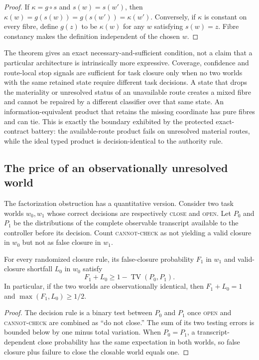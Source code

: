 \begin{proof}
If $\kappa=g\circ s$ and $s(w)=s(w')$, then
$\kappa(w)=g(s(w))=g(s(w'))=\kappa(w')$.  Conversely, if $\kappa$ is constant
on every fibre, define $g(z)$ to be $\kappa(w)$ for any $w$ satisfying
$s(w)=z$.  Fibre constancy makes the definition independent of the chosen
$w$.
\end{proof}

The theorem gives an exact necessary-and-sufficient condition, not a claim that
a particular architecture is intrinsically more expressive.  Coverage,
confidence and route-local stop signals are sufficient for task closure only
when no two worlds with the same retained state require different task
decisions.  A state that drops the materiality or unresolved status of an
unavailable route creates a mixed fibre and cannot be repaired by a different
classifier over that same state.  An information-equivalent product that
retains the missing coordinate has pure fibres and can tie.  This is exactly the
boundary exhibited by the protected exact-contract battery: the available-route
product fails on unresolved material routes, while the ideal typed product is
decision-identical to the authority rule.

\subsection{The price of an observationally unresolved world}

The factorization obstruction has a quantitative version.  Consider two task
worlds $w_0,w_1$ whose correct decisions are respectively \textsc{close} and
\textsc{open}.  Let $P_0$ and $P_1$ be the distributions of the complete
observable transcript available to the controller before its decision.  Count
\textsc{cannot-check} as not yielding a valid closure in $w_0$ but not as false
closure in $w_1$.

\begin{theorem}
\label{thm:indistinguishable}
For every randomized closure rule, its false-closure probability $F_1$ in
$w_1$ and valid-closure shortfall $L_0$ in $w_0$ satisfy
\[
 F_1+L_0\geq 1-\operatorname{TV}(P_0,P_1).
\]
In particular, if the two worlds are observationally identical, then
$F_1+L_0=1$ and $\max(F_1,L_0)\geq 1/2$.
\end{theorem}

\begin{proof}
The decision rule is a binary test between $P_0$ and $P_1$ once
\textsc{open} and \textsc{cannot-check} are combined as ``do not close.''  The
sum of its two testing errors is bounded below by one minus total variation.
When $P_0=P_1$, a transcript-dependent close probability has the same
expectation in both worlds, so false closure plus failure to close the closable
world equals one.
\end{proof}


